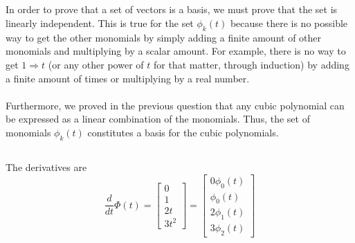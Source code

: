 \documentclass[]{article}
\numberwithin{equation}{section}
\begin{document}
\subsection{}

In order to prove that a set of vectors is a basis, we must prove that the set is linearly independent. 
This is true for the set \(\phi_k(t)\) because there is no possible way to get the other monomials by simply adding a finite amount of other monomials and multiplying by a scalar amount. 
For example, there is no way to get \(1 \Rightarrow t\) (or any other power of \(t\) for that matter, through induction) by adding a finite amount of times or multiplying by a real number. \\
\\
Furthermore, we proved in the previous question that any cubic polynomial can be expressed as a linear combination of the monomials. 
Thus, the set of monomials \(\phi_k(t)\) constitutes a basis for the cubic polynomials. 

\subsection{}

The derivatives are 
\begin{equation}
	\frac{d}{dt} \Phi(t) = \begin{bmatrix}
	0 \\
	1 \\
	2t \\
	3t^2
	\end{bmatrix} = \begin{bmatrix}
	0 \phi_0(t)\\
	\phi_0(t) \\
	2 \phi_1(t) \\
	3 \phi_2(t)
	\end{bmatrix}
\end{equation}

\subsection{}
\end{document}
